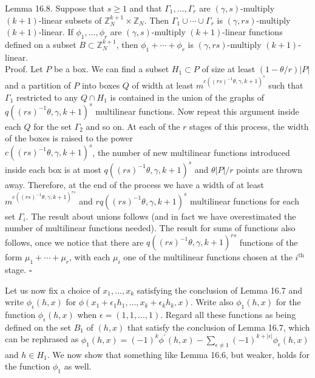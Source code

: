 \documentclass[10pt]{article}
\begin{document}
Lemma 16.8. Suppose that $s\geqslant1$ and that $\Gamma_{1}, \ldots, \Gamma_{r}$ are $(\gamma, s)$-multiply $(k+1)$-linear subsets of $\mathbb{Z}_{N}^{k+1} \times \mathbb{Z}_{N}$. Then $\Gamma_{1} \cup \cdots \cup \Gamma_{r}$ is $(\gamma, r s)$-multiply $(k+1)$-linear. If $\phi_{1}, \ldots, \phi_{r}$ are $(\gamma, s)$-multiply $(k+1)$-linear functions defined on a subset $B \subset \mathbb{Z}_{N}^{k+1}$, then $\phi_{1}+\cdots+\phi_{r}$ is $(\gamma, r s)$-multiply $(k+1)$-linear.\\
Proof. Let $P$ be a box. We can find a subset $H_{1} \subset P$ of size at least $(1-\theta / r)|P|$ and a partition of $P$ into boxes $Q$ of width at least $m^{c\left((r s)^{-1} \theta, \gamma, k+1\right)^{s}}$ such that $\Gamma_{1}$ restricted to any $Q \cap H_{1}$ is contained in the union of the graphs of $q\left((r s)^{-1} \theta, \gamma, k+1\right)^{s}$ multilinear functions. Now repeat this argument inside each $Q$ for the set $\Gamma_{2}$ and so on. At each of the $r$ stages of this process, the width of the boxes is raised to the power\\
$c\left((r s)^{-1} \theta, \gamma, k+1\right)^{s}$, the number of new multilinear functions introduced inside each box is at most $q\left((r s)^{-1} \theta, \gamma, k+1\right)^{s}$ and $\theta|P| / r$ points are thrown away. Therefore, at the end of the process we have a width of at least $m^{c\left((r s)^{-1} \theta, \gamma, k+1\right)^{r s}}$ and $r q\left((r s)^{-1} \theta, \gamma, k+1\right)^{s}$ multilinear functions for each set $\Gamma_{i}$. The result about unions follows (and in fact we have overestimated the number of multilinear functions needed). The result for sums of functions also follows, once we notice that there are $q\left((r s)^{-1} \theta, \gamma, k+1\right)^{r s}$ functions of the form $\mu_{1}+\cdots+\mu_{r}$, with each $\mu_{i}$ one of the multilinear functions chosen at the $i^{\text {th }}$ stage. \(\square\)

Let us now fix a choice of $x_{1}, \ldots, x_{k}$ satisfying the conclusion of Lemma 16.7 and write $\phi_{\epsilon}(h, x)$ for $\phi\left(x_{1}+\epsilon_{1} h_{1}, \ldots, x_{k}+\epsilon_{k} h_{k}, x\right)$. Write also $\phi_{1}(h, x)$ for the function $\phi_{\epsilon}(h, x)$ when $\epsilon=(1,1, \ldots, 1)$. Regard all these functions as being defined on the set $B_{1}$ of $(h, x)$ that satisfy the conclusion of Lemma 16.7, which can be rephrased as $\phi_{1}(h, x)=(-1)^{k}\phi^{\prime}(h, x)-\sum_{\epsilon \neq 1}(-1)^{k+|\epsilon|} \phi_{\epsilon}(h, x)$ and $h \in H_{1}$. We now show that something like Lemma 16.6, but weaker, holds for the function $\phi_{1}$ as well.
\end{document}
